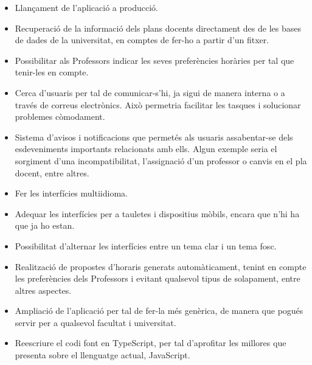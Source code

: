 \documentclass[a4paper,12pt]{ThesisStyle}
\begin{document}
\begin{itemize}
  \item Llançament de l'aplicació a producció.
  \item Recuperació de la informació dels plans docents directament des de les bases de dades de la universitat, en comptes de fer-ho a partir d'un fitxer.
  \item Possibilitar als Professors indicar les seves preferències horàries per tal que tenir-les en compte.
  \item Cerca d'usuaris per tal de comunicar-s'hi, ja sigui de manera interna o a través de correus electrònics. Això permetria facilitar les tasques i solucionar problemes còmodament.
  \item Sistema d'avisos i notificacions que permetés als usuaris assabentar-se dels esdeveniments importants relacionats amb ells. Algun exemple seria el sorgiment d'una incompatibilitat, l'assignació d'un professor o canvis en el pla docent, entre altres.
  \item Fer les interfícies multiidioma.
  \item Adequar les interfícies per a tauletes i dispositius mòbils, encara que n'hi ha que ja ho estan.
  \item Possibilitat d'alternar les interfícies entre un tema clar i un tema fosc.
  \item Realització de propostes d'horaris generats automàticament, tenint en compte les preferències dels Professors i evitant qualsevol tipus de solapament, entre altres aspectes.
  \item Ampliació de l'aplicació per tal de fer-la més genèrica, de manera que pogués servir per a qualsevol facultat i universitat.
  \item Reescriure el codi font en TypeScript, per tal d'aprofitar les millores que presenta sobre el llenguatge actual, JavaScript.
\end{itemize}


\backmatter



\end{document}
